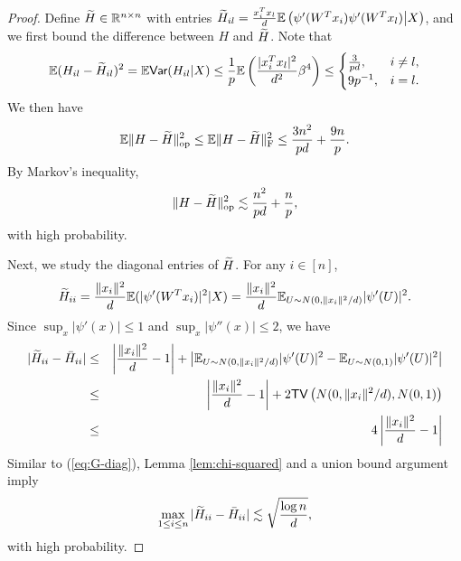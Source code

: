 \begin{proof}
Define $\widetilde{H}\in\mathbb{R}^{n\times n}$ with entries $\widetilde{H}_{il}=\frac{x_i^Tx_l}{d}\mathbb{E}\left(\psi'(W^Tx_i)\psi'(W^Tx_l)\big|X\right)$, and we first bound the difference between $H$ and $\widetilde{H}$. Note that
$$\mathbb{E}(H_{il}-\wt{H}_{il})^2=\mathbb{E}\Var(H_{il}|X)\leq \frac{1}{p}\mathbb{E}\left(\frac{|x_i^Tx_l|^2}{d^2}\beta^4\right)\leq\begin{cases}
\frac{3}{pd}, & i\neq l, \\
9p^{-1}, & i=l.
\end{cases}$$
We then have
$$\mathbb{E}\|H-\widetilde{H}\|_{\rm op}^2 \leq \mathbb{E}\|H-\widetilde{H}\|_{\rm F}^2 \leq \frac{3n^2}{pd} + \frac{9n}{p}.$$
By Markov's inequality,
\begin{equation}
\opnorm{H-\wt{H}}^2 \lesssim \frac{n^2}{pd} + \frac{n}{p}, \label{eq:H-H-tilde}
\end{equation}
with high probability.

Next, we study the diagonal entries of $\widetilde{H}$. For any $i\in[n]$,
$$\widetilde{H}_{ii}=\frac{\|x_i\|^2}{d}\mathbb{E}(|\psi'(W^Tx_i)|^2|X)=\frac{\|x_i\|^2}{d}\mathbb{E}_{U\sim N(0,\|x_i\|^2/d)}|\psi'(U)|^2.$$
Since $\sup_x|\psi'(x)|\leq 1$ and $\sup_x|\psi''(x)|\leq 2$, we have
\begin{eqnarray*}
|\wt{H}_{ii} - \bar{H}_{ii}| &\leq& \left|\frac{\|x_i\|^2}{d}-1\right| + \left|\mathbb{E}_{U\sim N(0,\|x_i\|^2/d)}|\psi'(U)|^2 - \mathbb{E}_{U\sim N(0,1)}|\psi'(U)|^2\right| \\
&\leq& \left|\frac{\|x_i\|^2}{d}-1\right| + 2\TV\left(N(0,\|x_i\|^2/d), N(0,1)\right) \\
&\leq& 4\left|\frac{\|x_i\|^2}{d}-1\right|
\end{eqnarray*}
Similar to (\ref{eq:G-diag}), Lemma \ref{lem:chi-squared} and a union bound argument imply
\begin{equation}
\max_{1\leq i\leq n}|\wt{H}_{ii}-\bar{H}_{ii}|\lesssim \sqrt{\frac{\log n}{d}}, \label{eq:H-diag}
\end{equation}
with high probability.


\end{proof}

